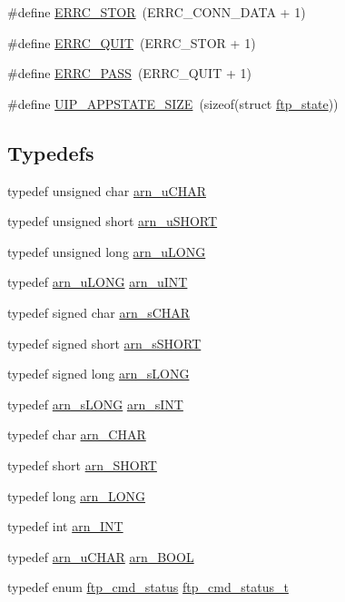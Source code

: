 \begin{DoxyCompactItemize}
\item 
\#define \hyperlink{group__ftp_gae63f2981f55f40322da00aa03fce1472}{ERRC\_\-STOR}~(ERRC\_\-CONN\_\-DATA + 1)
\item 
\#define \hyperlink{group__ftp_gacd22c3d419804a0d9ab9621aa5eb9a0d}{ERRC\_\-QUIT}~(ERRC\_\-STOR + 1)
\item 
\#define \hyperlink{group__ftp_gae2f7eeda61eb20dbd08413b4729bb5b5}{ERRC\_\-PASS}~(ERRC\_\-QUIT + 1)
\item 
\#define \hyperlink{group__ftp_ga0eae627d0514fa41cbc8fda0740f5794}{UIP\_\-APPSTATE\_\-SIZE}~(sizeof(struct \hyperlink{structftp__state}{ftp\_\-state}))
\end{DoxyCompactItemize}
\subsection*{Typedefs}
\begin{DoxyCompactItemize}
\item 
typedef unsigned char \hyperlink{group__ftp_ga748121386e994966f8a87f4160f055b4}{arn\_\-uCHAR}
\item 
typedef unsigned short \hyperlink{group__ftp_gaa290e3b930f0eff7f256b787fdbe02dc}{arn\_\-uSHORT}
\item 
typedef unsigned long \hyperlink{group__ftp_ga8b49fa3351457a2ef5c6f2b84c227953}{arn\_\-uLONG}
\item 
typedef \hyperlink{group__ftp_ga8b49fa3351457a2ef5c6f2b84c227953}{arn\_\-uLONG} \hyperlink{group__ftp_gaa8482f09ead6db56dc88c28e93b6c403}{arn\_\-uINT}
\item 
typedef signed char \hyperlink{group__ftp_gac337f9d5cafc356fbdbf5cf13e65ba6d}{arn\_\-sCHAR}
\item 
typedef signed short \hyperlink{group__ftp_gaf99068ab37d922a9909e69f2f438ba2a}{arn\_\-sSHORT}
\item 
typedef signed long \hyperlink{group__ftp_ga513c5078ef61e98f886e30e0160f9aed}{arn\_\-sLONG}
\item 
typedef \hyperlink{group__ftp_ga513c5078ef61e98f886e30e0160f9aed}{arn\_\-sLONG} \hyperlink{group__ftp_ga5c55a910c7442d4a6c3d12e9b9456a6d}{arn\_\-sINT}
\item 
typedef char \hyperlink{group__ftp_gab7c92ee10c15b851350edb8a4a3bb708}{arn\_\-CHAR}
\item 
typedef short \hyperlink{group__ftp_ga4141624391b35e060d6167502404c3a0}{arn\_\-SHORT}
\item 
typedef long \hyperlink{group__ftp_ga6094b3f192571d7477f6ee0feb3f6258}{arn\_\-LONG}
\item 
typedef int \hyperlink{group__ftp_gadfc1beb2750f692d8fc0b488fd53312b}{arn\_\-INT}
\item 
typedef \hyperlink{group__ftp_ga748121386e994966f8a87f4160f055b4}{arn\_\-uCHAR} \hyperlink{group__ftp_gaa90ab1d85ab7976982506605e340be8b}{arn\_\-BOOL}
\item 
typedef enum \hyperlink{group__ftp_ga6ba091973f82254c93d262d863c0de06}{ftp\_\-cmd\_\-status} \hyperlink{group__ftp_gabd3273961dc774ec260204513c2cea90}{ftp\_\-cmd\_\-status\_\-t}
\end{DoxyCompactItemize}

